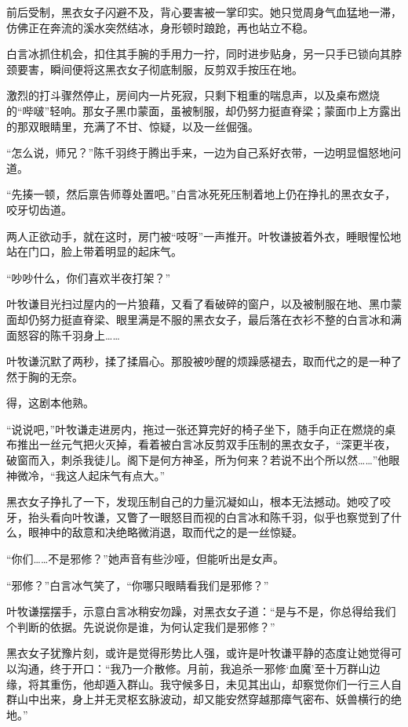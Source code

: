 前后受制，黑衣女子闪避不及，背心要害被一掌印实。她只觉周身气血猛地一滞，仿佛正在奔流的溪水突然结冰，身形顿时踉跄，再也站立不稳。

白言冰抓住机会，扣住其手腕的手用力一拧，同时进步贴身，另一只手已锁向其脖颈要害，瞬间便将这黑衣女子彻底制服，反剪双手按压在地。

激烈的打斗骤然停止，房间内一片死寂，只剩下粗重的喘息声，以及桌布燃烧的“哔啵”轻响。那女子黑巾蒙面，虽被制服，却仍努力挺直脊梁；蒙面巾上方露出的那双眼睛里，充满了不甘、惊疑，以及一丝倔强。

“怎么说，师兄？”陈千羽终于腾出手来，一边为自己系好衣带，一边明显愠怒地问道。

“先揍一顿，然后禀告师尊处置吧。”白言冰死死压制着地上仍在挣扎的黑衣女子，咬牙切齿道。

两人正欲动手，就在这时，房门被“吱呀”一声推开。叶牧谦披着外衣，睡眼惺忪地站在门口，脸上带着明显的起床气。

“吵吵什么，你们喜欢半夜打架？”

叶牧谦目光扫过屋内的一片狼藉，又看了看破碎的窗户，以及被制服在地、黑巾蒙面却仍努力挺直脊梁、眼里满是不服的黑衣女子，最后落在衣衫不整的白言冰和满面怒容的陈千羽身上……

叶牧谦沉默了两秒，揉了揉眉心。那股被吵醒的烦躁感褪去，取而代之的是一种了然于胸的无奈。

得，这剧本他熟。

“说说吧，”叶牧谦走进房内，拖过一张还算完好的椅子坐下，随手向正在燃烧的桌布推出一丝元气把火灭掉，看着被白言冰反剪双手压制的黑衣女子，“深更半夜，破窗而入，刺杀我徒儿。阁下是何方神圣，所为何来？若说不出个所以然……”他眼神微冷，“我这人起床气有点大。”

黑衣女子挣扎了一下，发现压制自己的力量沉凝如山，根本无法撼动。她咬了咬牙，抬头看向叶牧谦，又瞥了一眼怒目而视的白言冰和陈千羽，似乎也察觉到了什么，眼神中的敌意和决绝略微消退，取而代之的是一丝惊疑。

“你们……不是邪修？”她声音有些沙哑，但能听出是女声。

“邪修？”白言冰气笑了，“你哪只眼睛看我们是邪修？”

叶牧谦摆摆手，示意白言冰稍安勿躁，对黑衣女子道：“是与不是，你总得给我们个判断的依据。先说说你是谁，为何认定我们是邪修？”

黑衣女子犹豫片刻，或许是觉得形势比人强，或许是叶牧谦平静的态度让她觉得可以沟通，终于开口：“我乃一介散修。月前，我追杀一邪修‘血魔’至十万群山边缘，将其重伤，他却遁入群山。我守候多日，未见其出山，却察觉你们一行三人自群山中出来，身上并无灵枢玄脉波动，却又能安然穿越那瘴气密布、妖兽横行的绝地。”

